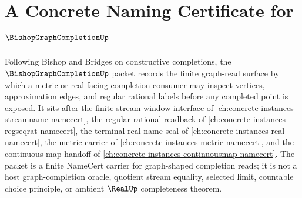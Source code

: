 \chapter{A Concrete Naming Certificate for $\BishopGraphCompletionUp$}
\label{ch:concrete-instances-bishop-graph-completion-namecert}

Following Bishop and Bridges on constructive completions, the $\BishopGraphCompletionUp$ packet records the finite graph-read surface by which a metric or real-facing completion consumer may inspect vertices, approximation edges, and regular rational labels before any completed point is exposed. It sits after the finite stream-window interface of \autoref{ch:concrete-instances-streamname-namecert}, the regular rational readback of \autoref{ch:concrete-instances-regseqrat-namecert}, the terminal real-name seal of \autoref{ch:concrete-instances-real-namecert}, the metric carrier of \autoref{ch:concrete-instances-metric-namecert}, and the continuous-map handoff of \autoref{ch:concrete-instances-continuousmap-namecert}. The packet is a finite NameCert carrier for graph-shaped completion reads; it is not a host graph-completion oracle, quotient stream equality, selected limit, countable choice principle, or ambient $\RealUp$ completeness theorem.

